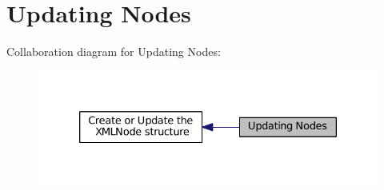 \hypertarget{group__xmlUpdate}{\section{Updating Nodes}
\label{group__xmlUpdate}
}
Collaboration diagram for Updating Nodes\-:
\nopagebreak
\begin{figure}[H]
\begin{center}
\leavevmode
\includegraphics[width=330pt]{group__xmlUpdate}
\end{center}
\end{figure}
